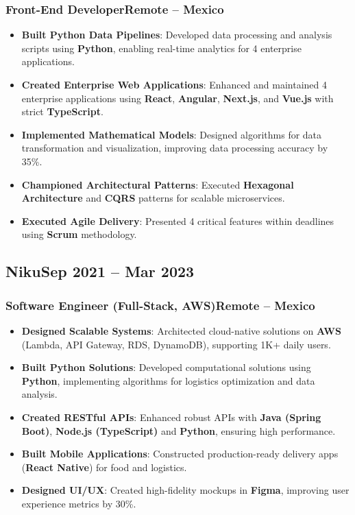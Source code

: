 \documentclass[a4paper,10pt]{article}
\newcommand{\kw}[1]{\textbf{\textcolor{keyword}{#1}}}
\newcommand{\tech}[1]{\textbf{\textcolor{tech}{#1}}}
\begin{document}
\subsubsection*{\small Front-End Developer\hfill Remote -- Mexico}
\begin{itemize}[noitemsep, leftmargin=*]
    \item \textbf{Built Python Data Pipelines}: Developed data processing and analysis scripts using \tech{Python}, enabling real-time analytics for 4 enterprise applications.
    \item \textbf{Created Enterprise Web Applications}: Enhanced and maintained 4 enterprise applications using \tech{React}, \tech{Angular}, \tech{Next.js}, and \tech{Vue.js} with strict \tech{TypeScript}.
    \item \textbf{Implemented Mathematical Models}: Designed algorithms for data transformation and visualization, improving data processing accuracy by 35\%.
    \item \textbf{Championed Architectural Patterns}: Executed \kw{Hexagonal Architecture} and \kw{CQRS} patterns for scalable microservices.
    \item \textbf{Executed Agile Delivery}: Presented 4 critical features within deadlines using \kw{Scrum} methodology.
\end{itemize}

\subsection*{\small Niku\hfill\textbf{Sep 2021 -- Mar 2023}}
\subsubsection*{\small Software Engineer (Full-Stack, AWS)\hfill Remote -- Mexico}
\begin{itemize}[noitemsep, leftmargin=*]
    \item \textbf{Designed Scalable Systems}: Architected cloud-native solutions on \tech{AWS} (Lambda, API Gateway, RDS, DynamoDB), supporting 1K+ daily users.
    \item \textbf{Built Python Solutions}: Developed computational solutions using \tech{Python}, implementing algorithms for logistics optimization and data analysis.
    \item \textbf{Created RESTful APIs}: Enhanced robust APIs with \tech{Java (Spring Boot)}, \tech{Node.js (TypeScript)} and \tech{Python}, ensuring high performance.
    \item \textbf{Built Mobile Applications}: Constructed production-ready delivery apps (\tech{React Native}) for food and logistics.
    \item \textbf{Designed UI/UX}: Created high-fidelity mockups in \tech{Figma}, improving user experience metrics by 30\%.
\end{itemize}
\end{document}
